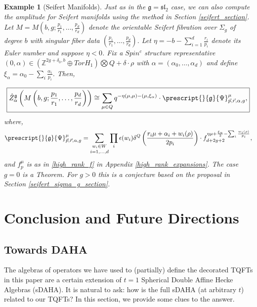\documentclass{article}
\newtheorem{example}{Example}[section]
\numberwithin{corollary}{theorem}
\numberwithin{corollary}{proposition}
\begin{document}
\begin{example}[Seifert Manifolds]
 Just as in the $\mathfrak{g}= \mathfrak{sl}_2$  case, we can also compute the amplitude for Seifert manifolds using the method in Section \ref{seifert_section}. Let $M= M(b,g;\frac{p_1}{r_1},\ldots,\frac{p_d}{r_d})$ denote the orientable Seifert fibration over $\Sigma_g$ of degree $b$ with singular fiber data $(\frac{p_1}{r_1},\ldots,\frac{p_d}{r_d})$. Let $\eta = -b -\sum^d_{i=1}\frac{r_i}{p_i}$ denote its Euler number and suppose $\eta<0$. Fix a $Spin^c$ structure representative $(0,\alpha) \in \left(\mathbb{Z}^{2g+\delta_0,b}\oplus TorH_1\right)\bigotimes Q+\delta \cdot \rho$ with $\alpha = (\alpha_0,\ldots,\alpha_d)$ and define $\xi_\alpha = \alpha_0 - \sum_i \frac{\alpha_i}{p_i}$. Then, 

$$\boxed{ \Hat{Z}^\mathfrak{g}_\alpha\left( M\left(b,g;\frac{p_1}{r_1},\ldots,\frac{p_d}{r_d}\right) \right) \cong \sum_{\mu \in Q}q^{-\eta (\mu,\mu) -(\mu, \xi_\alpha)} \cdot \prescript{}{\mathfrak{g}}{\Psi}^\mu_{\Vec{p},\Vec{r},\alpha,g},}$$
where, 
$$\prescript{}{\mathfrak{g}}{\Psi}^\mu_{\Vec{p},\Vec{r},\alpha,g} = \underset{i=1,\ldots,d}{\sum_{w_i\in W}} \prod_i \epsilon(w_i) \delta^Q\left( \frac{r_i \mu +\alpha_i+w_i(\rho)}{2p_i}\right)\cdot f^{\eta \mu  + \frac{\xi_\alpha}{2}- \sum_i\frac{w_i(\rho)}{p_i}}_{d+2g+2}, $$
and $f^\mu_p$ is as in \eqref{high_rank_f} in Appendix \ref{high_rank_expansions}. The case $g=0$ is a Theorem. For $g>0$ this is a conjecture based on the proposal in Section \ref{seifert_sigma_g_section}.    
\end{example}







\section{Conclusion and Future Directions}

\subsection{Towards DAHA}
The algebras of operators we have used to (partially) define the decorated TQFTs in this paper are a certain extension of $t=1$ Spherical Double Affine Hecke Algebras (sDAHA). It is natural to ask: how is the full sDAHA (at arbitrary $t$) related to our TQFTs? In this section, we provide some clues to the answer. 
\end{document}

